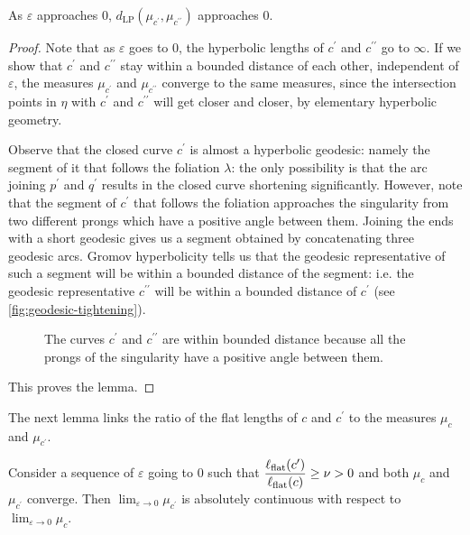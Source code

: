 \documentclass[12pt, reqno]{amsart}
\begin{document}
\begin{lemma}
  \label{lem:flat-length-tightening}
  As $\varepsilon$ approaches $0$, $d_{\mathrm{LP}}(\mu_{c^{\prime}}, \mu_{c^{\prime \prime}})$ approaches $0$.
\end{lemma}
\begin{proof}
  Note that as $\varepsilon$ goes to $0$, the hyperbolic lengths of $c^{\prime}$ and $c^{\prime \prime}$ go to $\infty$.
  If we show that $c^{\prime}$ and $c^{\prime \prime}$ stay within a bounded distance of each other, independent of $\varepsilon$, the measures $\mu_{c^{\prime}}$ and $\mu_{c^{\prime \prime}}$ converge to the same measures, since the intersection points in $\eta$ with $c^{\prime}$ and $c^{\prime \prime}$ will get closer and closer, by elementary hyperbolic geometry.

  Observe that the closed curve $c^{\prime}$ is almost a hyperbolic geodesic: namely the segment of it that follows the foliation $\lambda$: the only possibility is that the arc joining $p^{\prime}$ and $q^{\prime}$ results in the closed curve shortening significantly.
  However, note that the segment of $c^{\prime}$ that follows the foliation approaches the singularity from two different prongs which have a positive angle between them.
  Joining the ends with a short geodesic gives us a segment obtained by concatenating three geodesic arcs.
  Gromov hyperbolicity tells us that the geodesic representative of such a segment will be within a bounded distance of the segment: i.e. the geodesic representative $c^{\prime \prime}$ will be within a bounded distance of $c^{\prime}$ (see \autoref{fig:geodesic-tightening}).
  \begin{figure}[h]
    \centering
    \caption{The curves $c^{\prime}$ and $c^{\prime \prime}$ are within bounded distance because all the prongs of the singularity have a positive angle between them.}
    \label{fig:geodesic-tightening}
  \end{figure}
  This proves the lemma.
\end{proof}
The next lemma links the ratio of the flat lengths of $c$ and $c^{\prime}$ to the measures $\mu_c$ and $\mu_{c^{\prime}}$.
\begin{lemma}
  \label{lem:absolute-continuity}
  Consider a sequence of $\varepsilon$ going to $0$ such that $\displaystyle \frac{\ell_{\mathrm{flat}}(c^{\prime})}{\ell_{\mathrm{flat}}(c)} \geq \nu > 0$ and both $\mu_c$ and $\mu_{c^{\prime}}$ converge.
  Then $\lim_{\varepsilon \to 0} \mu_{c^{\prime}}$ is absolutely continuous with respect to $\lim_{\varepsilon \to 0} \mu_c$.
\end{lemma}
\end{document}

